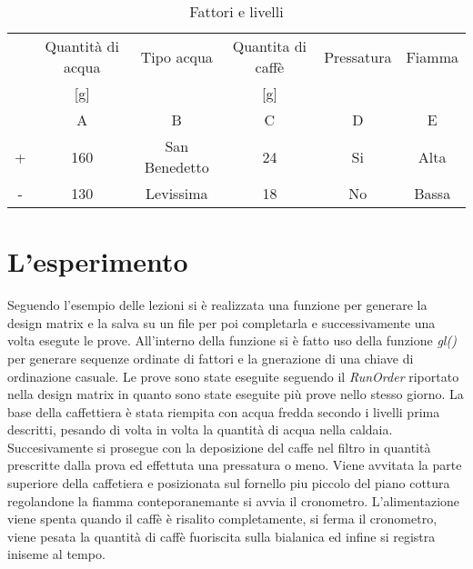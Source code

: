 \begin{table}[htb]
  \caption{Fattori e livelli}
  \label{tab:factorLvl}
  \begin{tabular}{cccccc}
    \hline
    & Quantità di acqua & Tipo acqua & Quantita di caffè & Pressatura & Fiamma\\
    & [g] &  & [g] &  & \\
    \hline
    & A &B&C&D&E\\
    \hline
  + & 160 & San Benedetto & 24 & Si & Alta\\
  - & 130 & Levissima & 18 & No & Bassa\\
  \hline
  \end{tabular}
\end{table}
\newpage
\section{L'esperimento}
Seguendo l'esempio delle lezioni si è realizzata una funzione per generare la design matrix  e la salva su un file per poi completarla e successivamente una volta esegute le prove.
All'interno della funzione si è fatto uso della funzione \emph{gl()} per generare sequenze ordinate di fattori e la gnerazione di una chiave di ordinazione casuale.
Le prove sono state eseguite seguendo il \emph{RunOrder} riportato nella design matrix in quanto sono state eseguite più prove nello stesso giorno.
La base della caffettiera è stata riempita con acqua fredda secondo i livelli prima descritti, pesando di volta in volta la quantità di acqua nella caldaia. Succesivamente si prosegue con la deposizione del caffe nel filtro in quantità prescritte dalla prova ed effettuta una pressatura o meno. Viene avvitata la parte superiore della caffetiera e posizionata sul fornello piu piccolo del piano cottura regolandone la fiamma conteporanemante si avvia il cronometro.
L'alimentazione viene spenta quando il caffè è risalito completamente, si ferma il cronometro, viene pesata la quantità di caffè fuoriscita sulla bialanica ed infine si registra iniseme al tempo.
